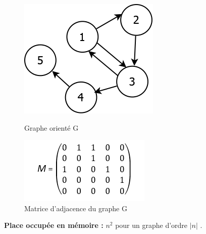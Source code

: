 \begin{figure}[H]
	\begin{minipage}[c]{.46\linewidth}
	\begin{center}
		\includegraphics[height=100 pt, width=110 pt]{./ressources/image/graphAdjace.png} 
		\caption{Graphe orienté G}
		\label{grapAdjac}
	\end{center}
	\end{minipage} 
	\begin{minipage}[c]{.46\linewidth}
	\begin{center}
		\includegraphics[height=110 pt, width=140 pt]{./ressources/image/matriceAdjac.png} 
		\caption{Matrice d'adjacence du graphe G}
		\label{matriceAdjac}
	\end{center}
	\end{minipage} 
\end{figure} 

\textbf{Place occupée en mémoire :} ${n}^{2}$ pour un graphe d'ordre $|n|$ \citep{lopez2003cours}.			
